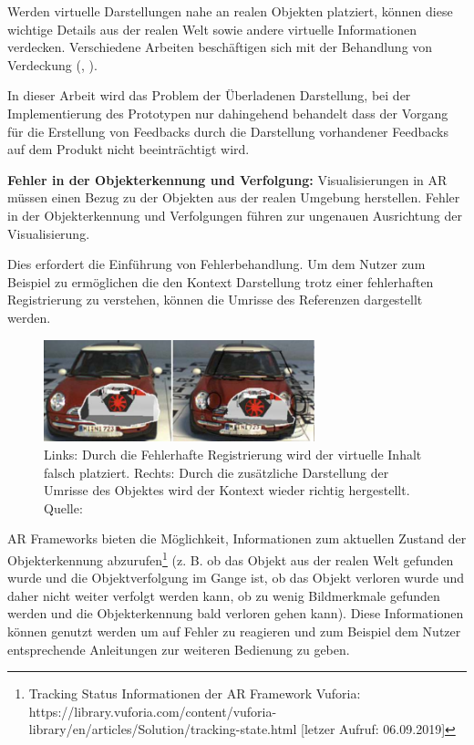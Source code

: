 Werden virtuelle Darstellungen nahe an realen Objekten platziert, können diese wichtige Details aus der realen Welt sowie andere virtuelle Informationen verdecken. 
Verschiedene Arbeiten beschäftigen sich mit der Behandlung von Verdeckung (\cite{Grasset2012}, \cite{Bell2001}).

In dieser Arbeit wird das Problem der Überladenen Darstellung, bei der Implementierung des Prototypen nur dahingehend behandelt dass der Vorgang für die Erstellung von 
Feedbacks durch die Darstellung vorhandener Feedbacks auf dem Produkt nicht beeinträchtigt wird. 

\textbf{Fehler in der Objekterkennung und Verfolgung:} Visualisierungen in AR müssen einen Bezug zu der Objekten aus der realen Umgebung herstellen. Fehler
in der Objekterkennung und Verfolgungen führen zur ungenauen Ausrichtung der Visualisierung.%

Dies erfordert die Einführung von Fehlerbehandlung. \cite[S.~243]{DieterSchmalstieg2016} Um dem Nutzer zum Beispiel zu ermöglichen die den Kontext Darstellung trotz einer fehlerhaften 
Registrierung zu verstehen, können die Umrisse des Referenzen dargestellt werden.

\begin{figure}[H]
	\centering
	\includegraphics[width=0.7\textwidth]{resources/fundamentals/missallignement.png}
	\caption{Links: Durch die Fehlerhafte Registrierung wird der virtuelle Inhalt falsch platziert. Rechts: Durch die zusätzliche Darstellung der Umrisse des Objektes wird der Kontext wieder richtig hergestellt. Quelle: \cite[S.~243]{DieterSchmalstieg2016}}
	\label{img:missallignement}
\end{figure}

AR Frameworks bieten die Möglichkeit, Informationen zum aktuellen Zustand der Objekterkennung abzurufen\footnote{Tracking Status Informationen der AR Framework Vuforia: https://library.vuforia.com/content/vuforia-library/en/articles/Solution/tracking-state.html [letzer Aufruf: 06.09.2019]} (z. B. ob das Objekt aus der realen Welt gefunden wurde und die Objektverfolgung im Gange ist, ob das Objekt verloren wurde und daher nicht weiter verfolgt werden kann, ob zu wenig Bildmerkmale gefunden werden und die Objekterkennung bald verloren gehen kann). 
Diese Informationen können genutzt werden um auf Fehler zu reagieren und zum Beispiel dem Nutzer entsprechende Anleitungen zur weiteren Bedienung zu geben.

